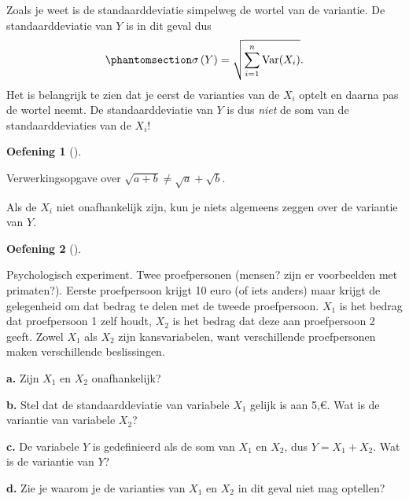 \documentclass[
  a4paper,
]{scrbook}
\theoremstyle{definition}
\newtheorem{exercise}{Oefening}[chapter]
\theoremstyle{definition}
\theoremstyle{remark}
\newcounter{quartocalloutcauno}
\newcommand{\quartocalloutcau}[1]{\refstepcounter{quartocalloutcauno}\label{#1}}
\begin{document}
\begin{tcolorbox}[enhanced jigsaw, arc=.35mm, bottomrule=.15mm, colframe=quarto-callout-caution-color-frame, colback=white, bottomtitle=1mm, colbacktitle=quarto-callout-caution-color!10!white, left=2mm, titlerule=0mm, coltitle=black, opacitybacktitle=0.6, breakable, toptitle=1mm, title=\textcolor{quarto-callout-caution-color}{\faFire}\hspace{0.5em}{Caution \ref*{cau-sdv-kansvariabele}: De standaarddeviatie van een som van kansvariabelen}, opacityback=0, toprule=.15mm, leftrule=.75mm, rightrule=.15mm]

\quartocalloutcau{cau-sdv-kansvariabele} 

Zoals je weet is de standaarddeviatie simpelweg de wortel van de
variantie. De standaarddeviatie van \(Y\) is in dit geval dus
\begin{equation}\phantomsection\label{eq-somvarianties}{ 
\sigma\left(Y\right) = \sqrt{\sum_{i = 1}^n \mathrm{Var}\!\left(X_i\right)}.
}\end{equation} Het is belangrijk te zien dat je eerst de varianties van
de \(X_i\) optelt en daarna pas de wortel neemt. De standaarddeviatie
van \(Y\) is dus \emph{niet} de som van de standaarddeviaties van de
\(X_i\)!

\end{tcolorbox}

\begin{exercise}[]\protect\hypertarget{exr-wortel}{}\label{exr-wortel}

Verwerkingsopgave over \(\sqrt{a + b} \neq \sqrt{a} + \sqrt{b}\).

\end{exercise}

Als de \(X_i\) niet onafhankelijk zijn, kun je niets algemeens zeggen
over de variantie van \(Y\).

\begin{exercise}[]\protect\hypertarget{exr-psychologisch-experiment}{}\label{exr-psychologisch-experiment}

Psychologisch experiment. Twee proefpersonen (mensen? zijn er
voorbeelden met primaten?). Eerste proefpersoon krijgt 10 euro (of iets
anders) maar krijgt de gelegenheid om dat bedrag te delen met de tweede
proefpersoon. \(X_1\) is het bedrag dat proefpersoon 1 zelf houdt,
\(X_2\) is het bedrag dat deze aan proefpersoon 2 geeft. Zowel \(X_1\)
als \(X_2\) zijn kansvariabelen, want verschillende proefpersonen maken
verschillende beslissingen.

\textbf{a.} Zijn \(X_1\) en \(X_2\) onafhankelijk?

\textbf{b.} Stel dat de standaarddeviatie van variabele \(X_1\) gelijk
is aan 5,€. Wat is de variantie van variabele \(X_2\)?

\textbf{c.} De variabele \(Y\) is gedefinieerd als de som van \(X_1\) en
\(X_2\), dus \(Y = X_1 + X_2\). Wat is de variantie van \(Y\)?

\textbf{d.} Zie je waarom je de varianties van \(X_1\) en \(X_2\) in dit
geval niet mag optellen?

\end{exercise}
\end{document}

